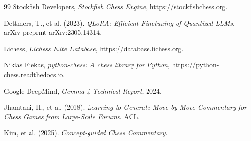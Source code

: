 \documentclass[a4paper,12pt]{report}
\begin{document}
\begin{thebibliography}{99}
Stockfish Developers, \textit{Stockfish Chess Engine}, https://stockfishchess.org.

Dettmers, T., et al. (2023). \textit{QLoRA: Efficient Finetuning of Quantized LLMs}. arXiv preprint arXiv:2305.14314.

Lichess, \textit{Lichess Elite Database}, https://database.lichess.org.

Niklas Fiekas, \textit{python-chess: A chess library for Python}, https://python-chess.readthedocs.io.

Google DeepMind, \textit{Gemma 4 Technical Report}, 2024.

Jhamtani, H., et al. (2018). \textit{Learning to Generate Move-by-Move Commentary for Chess Games from Large-Scale Forums}. ACL.

Kim, et al. (2025). \textit{Concept-guided Chess Commentary}.
\end{thebibliography}
\end{document}

